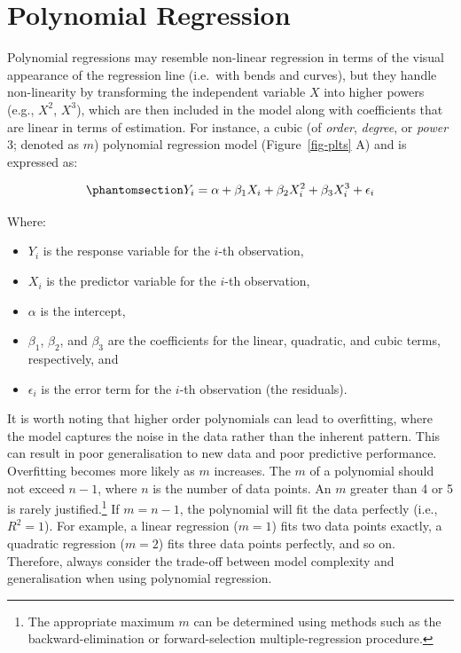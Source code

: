 \documentclass[
  letterpaper,
]{book}
\providecommand{\tightlist}{%
  \setlength{\itemsep}{0pt}\setlength{\parskip}{0pt}}\usepackage{longtable,booktabs,array}
\begin{document}
\chapter{Polynomial Regression}\label{sec-polynomial-regression}

Polynomial regressions may resemble
non-linear regression in terms of the visual appearance of the
regression line (i.e.~with bends and curves), but they handle
non-linearity by transforming the independent variable \(X\) into higher
powers (e.g., \(X^2\), \(X^3\)), which are then included in the model
along with coefficients that are linear in terms of estimation. For
instance, a cubic (of \emph{order}, \emph{degree}, or \emph{power} 3;
denoted as \(m\)) polynomial regression model (Figure~\ref{fig-plts} A)
and is expressed as:

\begin{equation}\phantomsection\label{eq-poly}{Y_i = \alpha + \beta_1 X_i + \beta_2 X_i^2 + \beta_3 X_i^3 + \epsilon_i}\end{equation}

Where:

\begin{itemize}
\tightlist
\item
  \(Y_i\) is the response variable for the \(i\)-th observation,
\item
  \(X_i\) is the predictor variable for the \(i\)-th observation,
\item
  \(\alpha\) is the intercept,
\item
  \(\beta_1\), \(\beta_2\), and \(\beta_3\) are the coefficients for the
  linear, quadratic, and cubic terms, respectively, and
\item
  \(\epsilon_i\) is the error term for the \(i\)-th observation (the
  residuals).
\end{itemize}

It is worth noting that higher order polynomials can lead to
overfitting, where the model captures the noise in
the data rather than the inherent pattern. This can result in poor
generalisation to new data and poor predictive performance. Overfitting
becomes more likely as \(m\) increases. The \(m\) of a polynomial should
not exceed \(n-1\), where \(n\) is the number of data points. An \(m\)
greater than 4 or 5 is rarely justified.\footnote{The appropriate
  maximum \(m\) can be determined using methods such as the
  backward-elimination or forward-selection multiple-regression
  procedure.} If \(m=n-1\), the polynomial will fit the data perfectly
(i.e., \(R^2=1\)). For example, a linear regression (\(m=1\)) fits two
data points exactly, a quadratic regression (\(m = 2\)) fits three data
points perfectly, and so on. Therefore, always consider the trade-off
between model complexity and generalisation when using polynomial
regression.
\end{document}
